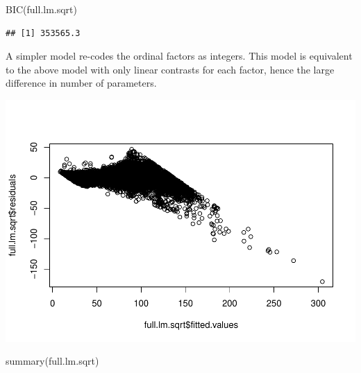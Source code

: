 \documentclass[
]{book}
\newenvironment{Shaded}{\begin{snugshade}}{\end{snugshade}}
\newcommand{\AttributeTok}[1]{\textcolor[rgb]{0.77,0.63,0.00}{#1}}
\newcommand{\FunctionTok}[1]{\textcolor[rgb]{0.00,0.00,0.00}{#1}}
\newcommand{\NormalTok}[1]{#1}
\newcommand{\OtherTok}[1]{\textcolor[rgb]{0.56,0.35,0.01}{#1}}
\newcommand{\SpecialCharTok}[1]{\textcolor[rgb]{0.00,0.00,0.00}{#1}}
\begin{document}
\begin{Shaded}
\begin{Highlighting}[]
\FunctionTok{BIC}\NormalTok{(full.lm.sqrt)}
\end{Highlighting}
\end{Shaded}

\begin{verbatim}
## [1] 353565.3
\end{verbatim}

A simpler model re-codes the ordinal factors as integers. This model is equivalent to the above model with only linear contrasts for each factor, hence the large difference in number of parameters.

\begin{Shaded}
\end{Shaded}

\includegraphics{13-MultipleLinearRegression_files/figure-latex/unnamed-chunk-5-1.pdf}

\begin{Shaded}
\begin{Highlighting}[]
\FunctionTok{summary}\NormalTok{(full.lm.sqrt)}
\end{Highlighting}
\end{Shaded}
\end{document}
